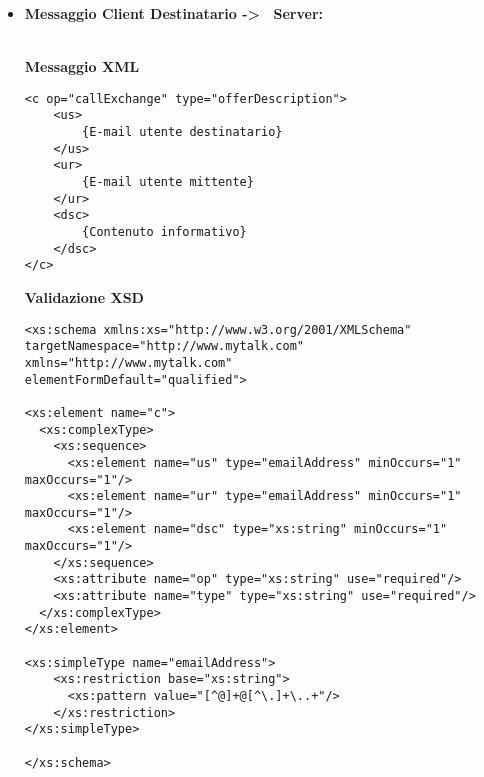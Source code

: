 {{\begin{itemize}
		\item[] \textbf{Messaggio Client Destinatario -\textgreater~ Server:}{\\
			\textbf{Messaggio XML}\\
				\begin{lstlisting}
<c op="callExchange" type="offerDescription">
	<us>
		{E-mail utente destinatario}
	</us>
	<ur>
		{E-mail utente mittente}
	</ur>
	<dsc>
		{Contenuto informativo}
	</dsc>
</c>
				\end{lstlisting}
				\textbf{Validazione XSD}\\
				\begin{lstlisting}
<xs:schema xmlns:xs="http://www.w3.org/2001/XMLSchema"
targetNamespace="http://www.mytalk.com"
xmlns="http://www.mytalk.com"
elementFormDefault="qualified">

<xs:element name="c">
  <xs:complexType>
    <xs:sequence>
      <xs:element name="us" type="emailAddress" minOccurs="1" maxOccurs="1"/>
      <xs:element name="ur" type="emailAddress" minOccurs="1" maxOccurs="1"/>
      <xs:element name="dsc" type="xs:string" minOccurs="1" maxOccurs="1"/>
    </xs:sequence>
    <xs:attribute name="op" type="xs:string" use="required"/>
    <xs:attribute name="type" type="xs:string" use="required"/>
  </xs:complexType>
</xs:element>

<xs:simpleType name="emailAddress"> 
    <xs:restriction base="xs:string"> 
      <xs:pattern value="[^@]+@[^\.]+\..+"/> 
    </xs:restriction> 
</xs:simpleType> 

</xs:schema>
				\end{lstlisting}
				}
		\end{itemize}
	}%

}
